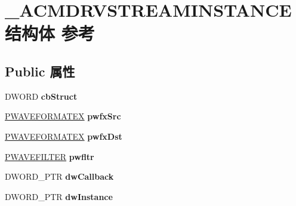 \hypertarget{struct___a_c_m_d_r_v_s_t_r_e_a_m_i_n_s_t_a_n_c_e}{}\section{\+\_\+\+A\+C\+M\+D\+R\+V\+S\+T\+R\+E\+A\+M\+I\+N\+S\+T\+A\+N\+C\+E结构体 参考}
\label{struct___a_c_m_d_r_v_s_t_r_e_a_m_i_n_s_t_a_n_c_e}
\subsection*{Public 属性}
\begin{DoxyCompactItemize}
\item 
\mbox{\label{struct___a_c_m_d_r_v_s_t_r_e_a_m_i_n_s_t_a_n_c_e_a1b5312f4927c3518ba4be615d3119535}} 
D\+W\+O\+RD {\bfseries cb\+Struct}
\item 
\mbox{\label{struct___a_c_m_d_r_v_s_t_r_e_a_m_i_n_s_t_a_n_c_e_a616de38d6ca942a2c44bbf8bd424dbae}} 
\hyperlink{struct___w_a_v_e_f_o_r_m_a_t_e_x}{P\+W\+A\+V\+E\+F\+O\+R\+M\+A\+T\+EX} {\bfseries pwfx\+Src}
\item 
\mbox{\label{struct___a_c_m_d_r_v_s_t_r_e_a_m_i_n_s_t_a_n_c_e_ae86f0a318911a059d79e87162c7f74e0}} 
\hyperlink{struct___w_a_v_e_f_o_r_m_a_t_e_x}{P\+W\+A\+V\+E\+F\+O\+R\+M\+A\+T\+EX} {\bfseries pwfx\+Dst}
\item 
\mbox{\label{struct___a_c_m_d_r_v_s_t_r_e_a_m_i_n_s_t_a_n_c_e_ae17c7bba12a1e1968dee6b5632a3126a}} 
\hyperlink{struct___w_a_v_e_f_i_l_t_e_r}{P\+W\+A\+V\+E\+F\+I\+L\+T\+ER} {\bfseries pwfltr}
\item 
\mbox{\label{struct___a_c_m_d_r_v_s_t_r_e_a_m_i_n_s_t_a_n_c_e_a6e9cc250746d39fec9a4f926c13b0f1c}} 
D\+W\+O\+R\+D\+\_\+\+P\+TR {\bfseries dw\+Callback}
\item 
\mbox{\label{struct___a_c_m_d_r_v_s_t_r_e_a_m_i_n_s_t_a_n_c_e_ad59fb3498788a8fce1ee61c6dc91d3f8}} 
D\+W\+O\+R\+D\+\_\+\+P\+TR {\bfseries dw\+Instance}

\end{DoxyCompactItemize}
